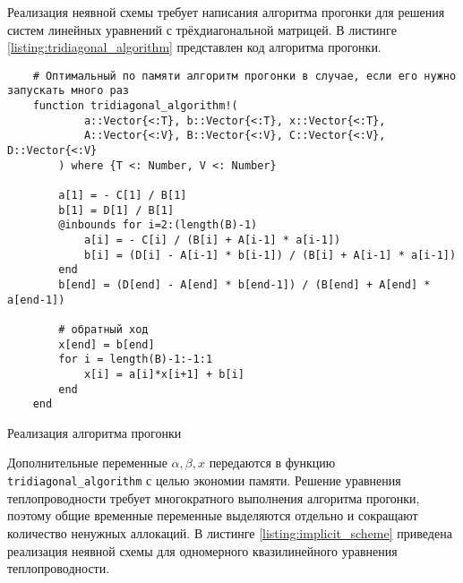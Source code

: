 Реализация неявной схемы требует написания алгоритма прогонки для решения систем линейных уравнений с трёхдиагональной матрицей.
В листинге \ref{listing:tridiagonal_algorithm} представлен код алгоритма прогонки.
\begin{listing}
    \begin{verbatim}
    # Оптимальный по памяти алгоритм прогонки в случае, если его нужно запускать много раз
    function tridiagonal_algorithm!(
            a::Vector{<:T}, b::Vector{<:T}, x::Vector{<:T},
            A::Vector{<:V}, B::Vector{<:V}, C::Vector{<:V}, D::Vector{<:V}
        ) where {T <: Number, V <: Number}
    
        a[1] = - C[1] / B[1]
        b[1] = D[1] / B[1]
        @inbounds for i=2:(length(B)-1)
            a[i] = - C[i] / (B[i] + A[i-1] * a[i-1])
            b[i] = (D[i] - A[i-1] * b[i-1]) / (B[i] + A[i-1] * a[i-1])
        end
        b[end] = (D[end] - A[end] * b[end-1]) / (B[end] + A[end] * a[end-1])
    
        # обратный ход
        x[end] = b[end]
        for i = length(B)-1:-1:1
            x[i] = a[i]*x[i+1] + b[i]
        end
    end
    \end{verbatim}
    \caption{Реализация алгоритма прогонки}
    \label{listing:tridiagonal_algorithm}
\end{listing}
Дополнительные переменные $\alpha, \beta, x$ передаются в функцию \texttt{tridiagonal\_algorithm} с целью экономии памяти.
Решение уравнения теплопроводности требует многократного выполнения алгоритма прогонки, поэтому общие временные переменные выделяются отдельно и сокращают количество ненужных аллокаций.
В листинге \ref{listing:implicit_scheme} приведена реализация неявной схемы для одномерного квазилинейного уравнения теплопроводности.
